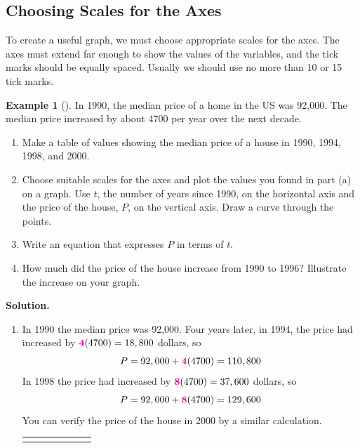 \documentclass[10pt,]{book}
\theoremstyle{plain}
\theoremstyle{definition}
\theoremstyle{definition}
\newtheorem{example}[theorem]{Example}
\theoremstyle{definition}
\numberwithin{equation}{part}
\newcommand{\hrulethick} {\noalign{\hrule height 0.11em}}
\newcommand{\alert}[1]{\boldsymbol{\color{magenta}{#1}}}
\begin{document}
\subsection[{Choosing Scales for the Axes}]{Choosing Scales for the Axes}\label{subsection-2}
To create a useful graph, we must choose appropriate scales for the axes.  The axes must extend far enough to show the values of the variables, and the tick marks should be equally spaced.  Usually we should use no more than 10 or 15 tick marks.%
\begin{example}[]\label{example-home-price}
In 1990, the median price of a home in the US was \textdollar{}92,000.  The median price increased by about \textdollar{}4700 per year over the next decade. \leavevmode%
\begin{enumerate}[label=\alph*]
\item\hypertarget{li-22}{}Make a table of values showing the median price of a house in 1990, 1994, 1998, and 2000.%
\item\hypertarget{li-23}{}Choose suitable scales for the axes and plot the values you found in part (a) on a graph. Use \(t\), the number of years since 1990, on the horizontal axis and the price of the house, \(P\), on the vertical axis.  Draw a curve through the points.%
\item\hypertarget{li-24}{}Write an equation that expresses \(P\) in terms of \(t\).%
\item\hypertarget{li-25}{}How much did the price of the house increase from 1990 to 1996?  Illustrate the increase on your graph.%
\end{enumerate}
%
\par\medskip\noindent%
\textbf{Solution.}\quad \leavevmode%
\begin{enumerate}[label=\alph*]
\item\hypertarget{li-26}{}In 1990 the median price was \textdollar{}92,000.  Four years later, in 1994, the price had increased by \(\alert{4}(4700)=18,800\) dollars, so%
\begin{equation*}
P=92,000+\alert{4}(4700)=110,800
\end{equation*}
In 1998 the price had increased by \(\alert{8}(4700)=37,600\)  dollars, so%
\begin{equation*}
P=92,000+\alert{8}(4700)=129,600
\end{equation*}
You can verify the price of the house in 2000 by a similar calculation.%
\begin{table}
\centering
\begin{tabular}{AcAcAcA}\hrulethick

\end{tabular}
\end{table}
\end{enumerate}
\end{example}
\end{document}
